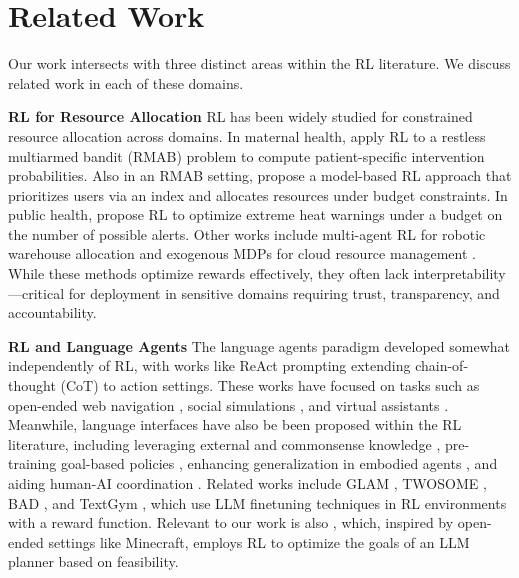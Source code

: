 \section{Related Work}
\label{sec:related}

Our work intersects with three distinct areas within the RL literature. We discuss related work in each of these domains.


\textbf{RL for Resource Allocation}\quad
RL has been widely studied for constrained resource allocation across domains. In maternal health, \citet{boehmer2024optimizing} apply RL to a restless multiarmed bandit (RMAB) problem \cite{whittle1988restless} to compute patient-specific intervention probabilities. Also in an RMAB setting, \citet{xiong2022index} propose a model-based RL approach that prioritizes users via an index and allocates resources under budget constraints. In public health, \citet{considine2023optimizing} propose RL to optimize  extreme heat warnings under a budget on the number of possible alerts. Other works include multi-agent RL for robotic warehouse allocation \cite{Shen2023} and exogenous MDPs for cloud resource management \cite{sinclair2023hindsight}. While these methods optimize rewards effectively, they often lack interpretability---critical for deployment in sensitive domains requiring trust, transparency, and accountability.


\textbf{RL and Language Agents}\quad 
The language agents \citep{sumers2024cognitive} paradigm developed somewhat independently of RL, with works like ReAct prompting \cite{yao2023react} extending chain-of-thought (CoT) \cite{wei2022chain} to action settings. These works have focused on tasks such as open-ended web navigation \citep{putta2024agent}, social simulations \citep{park2023generative}, and virtual assistants \citep{vezhnevets2023generative}. Meanwhile, language interfaces have also be been proposed within the RL literature, including leveraging external and commonsense knowledge \cite{feng2024natural, waytowich2024atari}, pre-training goal-based policies \cite{du2023guiding}, enhancing generalization in embodied agents \cite{szot2023large}, and aiding human-AI coordination \cite{srivastava2024policy, hu2023language}. Related works include GLAM \citep{carta2023grounding}, TWOSOME \cite{tantrue}, BAD \cite{wen2024reinforcing}, and TextGym \cite{xi2024agentgym}, which use LLM finetuning techniques in RL environments with a reward function. Relevant to our work is also \citet{wang2023describe}, which, inspired by open-ended settings like Minecraft, employs RL to optimize the goals of an LLM planner based on feasibility.



